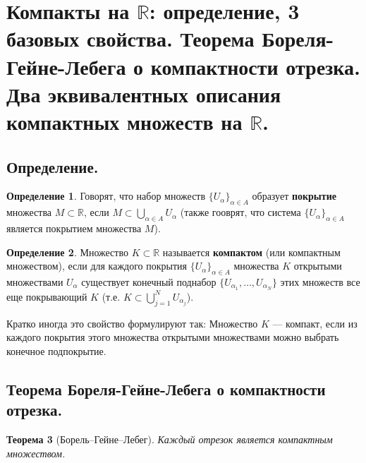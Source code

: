 \documentclass[12pt]{article}
\newtheorem{theorem}{Теорема}%
\theoremstyle{definition}
\newtheorem{definition}[theorem]{Определение}
\begin{document}
\section{Компакты на $\mathbb{R}$: определение, 3 базовых свойства. Теорема Бореля-Гейне-Лебега о компактности отрезка. Два эквивалентных описания компактных множеств на $\mathbb{R}$.}

\subsection{Определение.}

\begin{definition}
Говорят, что набор множеств $\{U_\alpha\}_{\alpha\in A}$ образует {\bf покрытие}
множества $M\subset \mathbb{R}$, если $M\subset \bigcup\limits_{\alpha\in A}U_\alpha$
(также гооврят, что система $\{U_\alpha\}_{\alpha\in A}$ является покрытием множества $M$).
\end{definition}

\begin{definition}
Множество $K\subset \mathbb{R}$ называется {\bf компактом} (или компактным множеством),
если для каждого покрытия $\{U_\alpha\}_{\alpha\in A}$ множества $K$
открытыми множествами $U_\alpha$ существует конечный поднабор
$\{U_{\alpha_1}, \ldots, U_{\alpha_N}\}$ этих множеств все еще покрывающий $K$
(т.е. $K\subset \bigcup_{j=1}^N U_{\alpha_{j}}$).

Кратко иногда это свойство формулируют так:
Множество $K$ --- компакт, если из каждого покрытия этого множества открытыми множествами
можно выбрать конечное подпокрытие.
\end{definition}

\subsection{Теорема Бореля-Гейне-Лебега о компактности отрезка.}

\begin{theorem}[Борель--Гейне--Лебег]
Каждый отрезок является компактным множеством.
\end{theorem}
\end{document}

